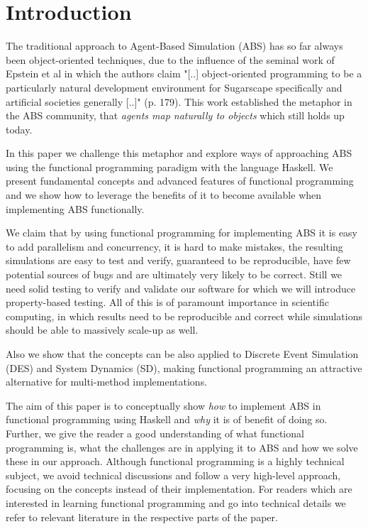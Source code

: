 \section{Introduction}


The traditional approach to Agent-Based Simulation (ABS) has so far always been object-oriented techniques, due to the influence of the seminal work of Epstein et al \cite{epstein_growing_1996} in which the authors claim "[..] object-oriented programming to be a particularly natural development environment for Sugarscape specifically and artificial societies generally [..]" (p. 179). This work established the metaphor in the ABS community, that \textit{agents map naturally to objects} \cite{north_managing_2007} which still holds up today.

In this paper we challenge this metaphor and explore ways of approaching ABS using the functional programming paradigm with the language Haskell. We present fundamental concepts and advanced features of functional programming and we show how to leverage the benefits of it \cite{hudak_history_2007} to become available when implementing ABS functionally.

We claim that by using functional programming for implementing ABS it is easy to add parallelism and concurrency, it is hard to make mistakes, the resulting simulations are easy to test and verify, guaranteed to be reproducible, have few potential sources of bugs and are ultimately very likely to be correct. Still we need solid testing to verify and validate our software for which we will introduce property-based testing. All of this is of paramount importance in scientific computing, in which results need to be reproducible and correct while simulations should be able to massively scale-up as well.

Also we show that the concepts can be also applied to Discrete Event Simulation (DES) and System Dynamics (SD), making functional programming an attractive alternative for multi-method implementations.

The aim of this paper is to conceptually show \textit{how} to implement ABS in functional programming using Haskell and \textit{why} it is of benefit of doing so. Further, we give the reader a good understanding of what functional programming is, what the challenges are in applying it to ABS and how we solve these in our approach. Although functional programming is a highly technical subject, we avoid technical discussions and follow a very high-level approach, focusing on the concepts instead of their implementation. For readers which are interested in learning functional programming and go into technical details we refer to relevant literature in the respective parts of the paper.

